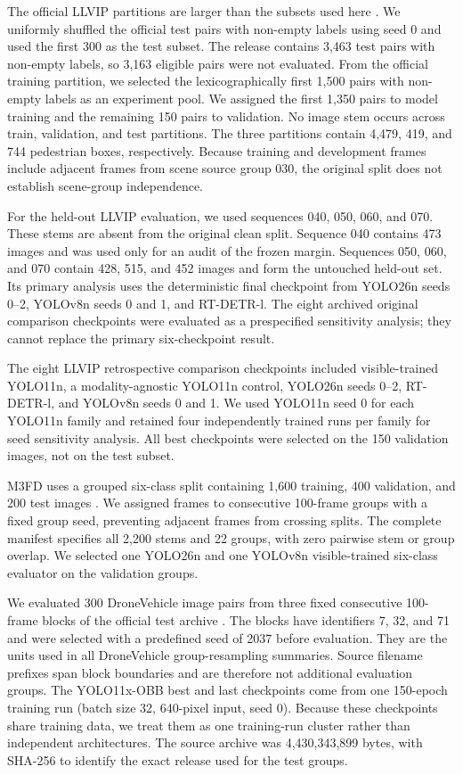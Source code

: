 \documentclass[preprint,11pt]{elsarticle}
\begin{document}
The official LLVIP partitions are larger than the subsets used here
\cite{jia2021}. We uniformly shuffled the official test pairs with non-empty
labels using seed 0 and used the first 300 as the test subset. The release
contains 3,463 test pairs with non-empty labels, so 3,163 eligible pairs were
not evaluated. From the official training partition, we selected the
lexicographically first 1,500 pairs with non-empty labels as an experiment
pool. We assigned the first 1,350 pairs to model training and the remaining 150
pairs to validation. No image stem occurs across train, validation, and test
partitions. The three partitions contain 4,479, 419, and 744 pedestrian boxes,
respectively. Because training and development frames include adjacent frames
from scene source group 030, the original split does not establish
scene-group independence.

For the held-out LLVIP evaluation, we used sequences 040, 050, 060, and 070.
These stems are absent from the original clean split. Sequence 040 contains
473 images and was used only for an audit of the frozen margin. Sequences 050,
060, and 070 contain 428, 515, and 452 images and form the untouched
held-out set. Its primary analysis uses the deterministic final checkpoint
from YOLO26n seeds 0--2, YOLOv8n seeds 0 and 1, and RT-DETR-l. The eight
archived original comparison checkpoints were evaluated as a prespecified
sensitivity analysis; they cannot replace the primary six-checkpoint result.

The eight LLVIP retrospective comparison checkpoints included visible-trained YOLO11n, a
modality-agnostic YOLO11n control, YOLO26n seeds 0--2, RT-DETR-l, and YOLOv8n
seeds 0 and 1. We used YOLO11n seed 0 for each YOLO11n family and retained four
independently trained runs per family for seed sensitivity analysis. All best
checkpoints were selected on the 150 validation images, not on the test subset.

M3FD uses a grouped six-class split containing 1,600 training, 400 validation,
and 200 test images \cite{liu2022}. We assigned frames to consecutive 100-frame
groups with a fixed group seed, preventing adjacent frames from crossing splits.
The complete manifest specifies all 2,200 stems and 22 groups, with zero
pairwise stem or group overlap. We selected one YOLO26n and one YOLOv8n
visible-trained six-class evaluator on the validation groups.

We evaluated 300 DroneVehicle image pairs from three fixed consecutive 100-frame
blocks of the official test archive \cite{sun2022}. The blocks have identifiers
7, 32, and 71 and were selected with a predefined seed of 2037 before
evaluation. They are the units used in all DroneVehicle group-resampling
summaries. Source filename prefixes span block boundaries and are therefore not
additional evaluation groups. The YOLO11x-OBB best and last checkpoints come
from one 150-epoch training run (batch size 32, 640-pixel input, seed 0).
Because these checkpoints share training data, we treat them as one
training-run cluster rather than independent architectures. The source archive
was 4,430,343,899 bytes, with SHA-256
\texttt{}
to identify the exact release used for the test groups.
\end{document}
